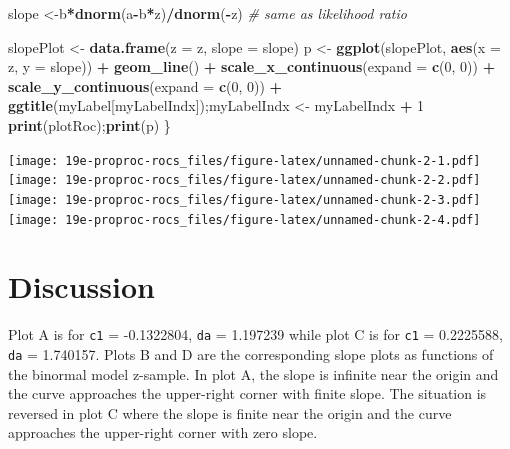 \documentclass[
]{book}
\newenvironment{Shaded}{\begin{snugshade}}{\end{snugshade}}
\newcommand{\CommentTok}[1]{\textcolor[rgb]{0.56,0.35,0.01}{\textit{#1}}}
\newcommand{\DataTypeTok}[1]{\textcolor[rgb]{0.13,0.29,0.53}{#1}}
\newcommand{\DecValTok}[1]{\textcolor[rgb]{0.00,0.00,0.81}{#1}}
\newcommand{\KeywordTok}[1]{\textcolor[rgb]{0.13,0.29,0.53}{\textbf{#1}}}
\newcommand{\NormalTok}[1]{#1}
\newcommand{\OperatorTok}[1]{\textcolor[rgb]{0.81,0.36,0.00}{\textbf{#1}}}
\newcommand{\StringTok}[1]{\textcolor[rgb]{0.31,0.60,0.02}{#1}}
\begin{document}
\begin{Shaded}
\begin{Highlighting}[]
\NormalTok{  slope <-b}\OperatorTok{*}\KeywordTok{dnorm}\NormalTok{(a}\OperatorTok{-}\NormalTok{b}\OperatorTok{*}\NormalTok{z)}\OperatorTok{/}\KeywordTok{dnorm}\NormalTok{(}\OperatorTok{-}\NormalTok{z) }\CommentTok{# same as likelihood ratio}
  
\NormalTok{  slopePlot <-}\StringTok{ }\KeywordTok{data.frame}\NormalTok{(}\DataTypeTok{z =}\NormalTok{ z, }\DataTypeTok{slope =}\NormalTok{ slope)}
\NormalTok{  p <-}\StringTok{ }\KeywordTok{ggplot}\NormalTok{(slopePlot, }\KeywordTok{aes}\NormalTok{(}\DataTypeTok{x =}\NormalTok{ z, }\DataTypeTok{y =}\NormalTok{ slope)) }\OperatorTok{+}\StringTok{ }
\StringTok{    }\KeywordTok{geom_line}\NormalTok{()  }\OperatorTok{+}\StringTok{ }
\StringTok{    }\KeywordTok{scale_x_continuous}\NormalTok{(}\DataTypeTok{expand =} \KeywordTok{c}\NormalTok{(}\DecValTok{0}\NormalTok{, }\DecValTok{0}\NormalTok{)) }\OperatorTok{+}\StringTok{ }
\StringTok{    }\KeywordTok{scale_y_continuous}\NormalTok{(}\DataTypeTok{expand =} \KeywordTok{c}\NormalTok{(}\DecValTok{0}\NormalTok{, }\DecValTok{0}\NormalTok{))  }\OperatorTok{+}
\StringTok{    }\KeywordTok{ggtitle}\NormalTok{(myLabel[myLabelIndx]);myLabelIndx <-}\StringTok{ }\NormalTok{myLabelIndx }\OperatorTok{+}\StringTok{ }\DecValTok{1}
  \KeywordTok{print}\NormalTok{(plotRoc);}\KeywordTok{print}\NormalTok{(p)}
\NormalTok{\}}
\end{Highlighting}
\end{Shaded}

\texttt{[image: 19e-proproc-rocs\_files/figure-latex/unnamed-chunk-2-1.pdf]} \texttt{[image: 19e-proproc-rocs\_files/figure-latex/unnamed-chunk-2-2.pdf]} \texttt{[image: 19e-proproc-rocs\_files/figure-latex/unnamed-chunk-2-3.pdf]} \texttt{[image: 19e-proproc-rocs\_files/figure-latex/unnamed-chunk-2-4.pdf]}

\hypertarget{discussion}{%
\section{Discussion}\label{discussion}}

Plot A is for \texttt{c1} = -0.1322804, \texttt{da} = 1.197239 while plot C is for \texttt{c1} = 0.2225588, \texttt{da} = 1.740157. Plots B and D are the corresponding slope plots as functions of the binormal model z-sample. In plot A, the slope is infinite near the origin and the curve approaches the upper-right corner with finite slope. The situation is reversed in plot C where the slope is finite near the origin and the curve approaches the upper-right corner with zero slope.
\end{document}
